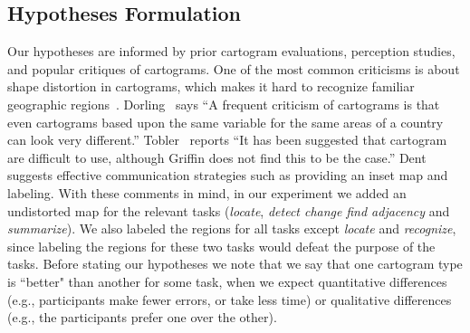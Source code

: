 \documentclass[10pt,journal,compsoc]{IEEEtran}
\begin{document}
\begin{comment}
\textbf{Performance of subjects:}
This criteria is used to test the effectiveness of the visualization and it examines the user's performance of the tasks. Effectiveness is measured by the time spent to complete tasks~\cite{koua2006evaluating}, the percentage of completed tasks~\cite{sweeney1993evaluating}, the accuracy of the completed tasks etc. 
 
\textbf{Attitude of subjects:}
This refers to user reactions and opinions about the compatibility, flexibility of the tool. User feedback can be collected through questionnaire, survey responses, ratings and comments from interviews. 

\end{comment}

\subsection{Hypotheses Formulation}
\label{sec:hypotheses}




Our hypotheses are informed by prior cartogram evaluations, perception studies,  and popular critiques of cartograms.
One of the most common criticisms is about shape distortion in cartograms, which makes it hard to recognize familiar geographic regions~\cite{Tobler04}. 
Dorling~\cite{dorling96} says ``A frequent criticism of cartograms is that even cartograms based upon the same variable for the same areas of a country can look very different.'' 
Tobler~\cite{Tobler04} reports ``It has been suggested that cartogram are difficult to use, although Griffin does not find this to be the case.'' 
Dent~\cite{dent1975}  suggests effective communication strategies such as providing an inset map and labeling.
With these comments in mind, in our experiment we added an undistorted map for the relevant tasks (\textit{locate}, \textit{detect change} \textit{find adjacency} and \textit{summarize}). 
We also labeled the regions for all tasks except \textit{locate} and \textit{recognize}, since labeling the regions for these two tasks would defeat the purpose of the tasks.
Before stating our hypotheses we note that we say that one cartogram type is ``better" than another for some task, when we expect quantitative differences (e.g., participants make fewer errors, or take less time) or qualitative differences (e.g., the participants prefer one over the other). 
\end{document}
